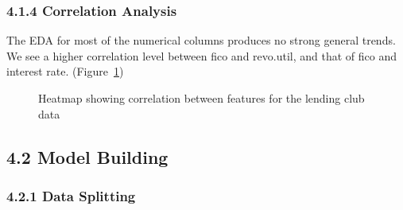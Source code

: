 \documentclass[
  letterpaper,
  DIV=11,
  numbers=noendperiod]{scrartcl}
\begin{document}
\newpage

\subsubsection{4.1.4 Correlation Analysis}\label{correlation-analysis}

The EDA for most of the numerical columns produces no strong general
trends. We see a higher correlation level between fico and revo.util,
and that of fico and interest rate. (Figure~\ref{fig-corr_map})

\begin{figure}


\caption{\label{fig-corr_map}Heatmap showing correlation between
features for the lending club data}

\end{figure}%

\subsection{\texorpdfstring{4.2 Model Building
}{4.2 Model Building  }}\label{model-building}

\subsubsection{4.2.1 Data Splitting}\label{data-splitting}
\end{document}
